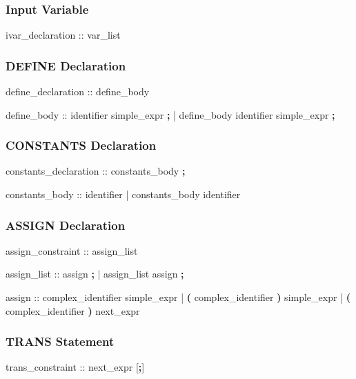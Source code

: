 \subsubsection{Input Variable}
\begin{Grammar}
ivar_declaration ::  var_list
\end{Grammar}


\subsubsection{DEFINE Declaration}
\begin{Grammar}
define_declaration ::  define_body

define_body :: identifier \operator{:=} simple_expr \textbf{;}
             | define_body identifier \operator{:=} simple_expr \textbf{;}
\end{Grammar}


\subsubsection{CONSTANTS Declaration}
\begin{Grammar}
constants_declaration ::  constants_body \textbf{;}

constants_body :: identifier 
             | constants_body  \operator{,} identifier
\end{Grammar}


\subsubsection{ASSIGN Declaration}
\begin{Grammar}
assign_constraint ::  assign_list

assign_list :: assign \textbf{;}
             | assign_list assign \textbf{;}

assign ::
    complex_identifier          \operator{:=} simple_expr
  |  \textbf{(} complex_identifier \textbf{)} \operator{:=} simple_expr
  |  \textbf{(} complex_identifier \textbf{)} \operator{:=} next_expr
\end{Grammar}


\subsubsection{TRANS Statement}
\begin{Grammar}
trans_constraint ::  next_expr [\textbf{;}]
\end{Grammar}


